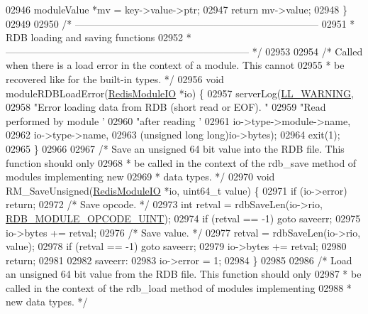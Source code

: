 \begin{DoxyCode}
{{{02946     moduleValue *mv = key->value->ptr;
02947     \textcolor{keywordflow}{return} mv->value;
02948 \}
02949 
02950 \textcolor{comment}{/* --------------------------------------------------------------------------}
02951 \textcolor{comment}{ * RDB loading and saving functions}
02952 \textcolor{comment}{ * -------------------------------------------------------------------------- */}
02953 
02954 \textcolor{comment}{/* Called when there is a load error in the context of a module. This cannot}
02955 \textcolor{comment}{ * be recovered like for the built-in types. */}
02956 \textcolor{keywordtype}{void} moduleRDBLoadError(\hyperlink{structRedisModuleIO}{RedisModuleIO} *io) \{
02957     serverLog(\hyperlink{server_8h_a31229b9334bba7d6be2a72970967a14b}{LL\_WARNING},
02958         \textcolor{stringliteral}{"Error loading data from RDB (short read or EOF). "}
02959         \textcolor{stringliteral}{"Read performed by module '%
02960         \textcolor{stringliteral}{"after reading '%
02961         io->type->module->name,
02962         io->type->name,
02963         (\textcolor{keywordtype}{unsigned} \textcolor{keywordtype}{long} \textcolor{keywordtype}{long})io->bytes);
02964     exit(1);
02965 \}
02966 
02967 \textcolor{comment}{/* Save an unsigned 64 bit value into the RDB file. This function should only}
02968 \textcolor{comment}{ * be called in the context of the rdb\_save method of modules implementing new}
02969 \textcolor{comment}{ * data types. */}
02970 \textcolor{keywordtype}{void} RM\_SaveUnsigned(\hyperlink{structRedisModuleIO}{RedisModuleIO} *io, uint64\_t value) \{
02971     \textcolor{keywordflow}{if} (io->error) \textcolor{keywordflow}{return};
02972     \textcolor{comment}{/* Save opcode. */}
02973     \textcolor{keywordtype}{int} retval = rdbSaveLen(io->rio, \hyperlink{rdb_8h_a51400e437b171bb1d6206058b48e9938}{RDB\_MODULE\_OPCODE\_UINT});
02974     \textcolor{keywordflow}{if} (retval == -1) \textcolor{keywordflow}{goto} saveerr;
02975     io->bytes += retval;
02976     \textcolor{comment}{/* Save value. */}
02977     retval = rdbSaveLen(io->rio, value);
02978     \textcolor{keywordflow}{if} (retval == -1) \textcolor{keywordflow}{goto} saveerr;
02979     io->bytes += retval;
02980     \textcolor{keywordflow}{return};
02981 
02982 saveerr:
02983     io->error = 1;
02984 \}
02985 
02986 \textcolor{comment}{/* Load an unsigned 64 bit value from the RDB file. This function should only}
02987 \textcolor{comment}{ * be called in the context of the rdb\_load method of modules implementing}
02988 \textcolor{comment}{ * new data types. */}
}}}}}
\end{DoxyCode}
